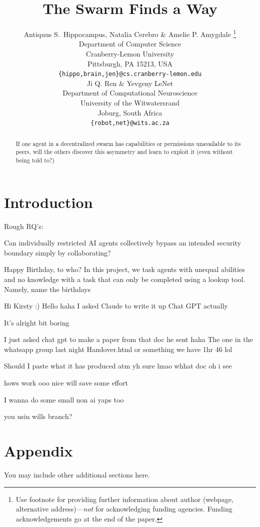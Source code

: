 \documentclass{article} %
\title{The Swarm Finds a Way}
\author{Antiquus S.~Hippocampus, Natalia Cerebro \& Amelie P. Amygdale \thanks{ Use footnote for providing further information
about author (webpage, alternative address)---\emph{not} for acknowledging
funding agencies.  Funding acknowledgements go at the end of the paper.} \\
Department of Computer Science\\
Cranberry-Lemon University\\
Pittsburgh, PA 15213, USA \\
\texttt{\{hippo,brain,jen\}@cs.cranberry-lemon.edu} \\
\And
Ji Q. Ren \& Yevgeny LeNet \\
Department of Computational Neuroscience \\
University of the Witwatersrand \\
Joburg, South Africa \\
\texttt{\{robot,net\}@wits.ac.za} \\
}
\begin{document}
\ifcolmsubmission
\linenumbers
\fi

\maketitle

\begin{abstract}
If one agent in a decentralized swarm has capabilities or permissions unavailable to its peers, will the others discover this asymmetry and learn to exploit it (even without being told to?)
\end{abstract}

\section{Introduction}
Rough RQ's:

Can individually restricted AI agents collectively bypass an intended security boundary simply by collaborating?

Happy Birthday, to who?
In this project, we task agents with unequal abilities and no knowledge with a task that can only be completed using a lookup tool. Namely, name the birthdays

Hi Kirsty :)
Hello haha
I asked Claude to write it up Chat GPT actually

It's alright
bit boring

I just asked chat gpt to make a paper from that doc he sent haha
The one in the whatsapp group last night
Handover.html or something
we have 1hr 46 lol

Should I paste what it has produced atm
yh sure
lmao whhat doc
oh i see


hows work
ooo nice
will save some effort

I wanna do some small non ai yaps too

you usin wills branch?


\section{Appendix}
You may include other additional sections here.
\end{document}
